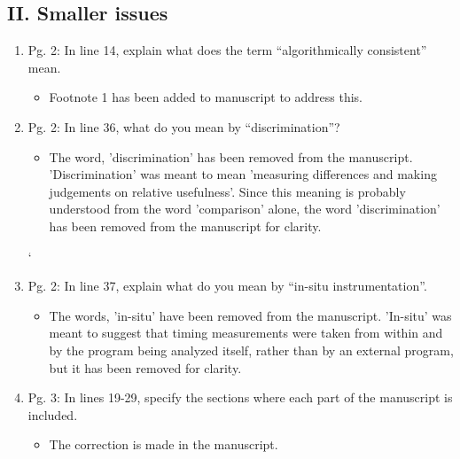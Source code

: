 \documentclass{article}
\begin{document}
  \subsection*{II. Smaller issues}
  \begin{enumerate}

  \item
	Pg. 2: In line 14, explain what does the term ``algorithmically consistent'' mean.

{\color{red}
  \begin{itemize}
      \item Footnote 1 has been added to manuscript to address this.
  \end{itemize}}

  \item
	Pg. 2: In line 36, what do you mean by “discrimination”?

{\color{red}  
\begin{itemize}
     \item

      The word, 'discrimination' has been removed from the manuscript.
      'Discrimination' was meant to mean 'measuring differences and making
      judgements on relative usefulness'. Since this meaning is probably
      understood from the word 'comparison' alone, the word 'discrimination'
      has been removed from the manuscript for clarity.
      
  \end{itemize}}
	
` \item	
	Pg. 2: In line 37, explain what do you mean by “in-situ instrumentation”.

{\color{red}  
\begin{itemize}
     \item
         
      The words, 'in-situ' have been removed from the manuscript. 'In-situ' was
      meant to suggest that timing measurements were taken from within and by
      the program being analyzed itself, rather than by an external program,
      but it has been removed for clarity.

  \end{itemize}}
	
  \item 
	Pg. 3: In lines 19-29, specify the sections where each part of the manuscript is
included.

{\color{red}  
\begin{itemize}
     \item
      The correction is made in the manuscript.
  \end{itemize}}


\end{enumerate}
\end{document}
